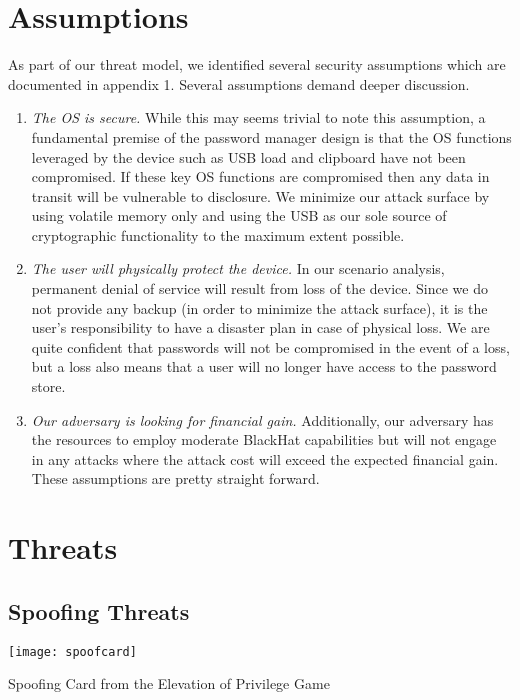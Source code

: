 \section{Assumptions}
\label{sec:assumptions}
As part of our threat model, we identified several security assumptions which are documented in appendix 1.  Several assumptions demand deeper discussion.
\begin{enumerate}
    \item{\emph{The OS is secure.} While this may seems trivial to note this assumption, a fundamental premise of the password manager design is that the OS functions leveraged by the device such as USB load and clipboard have not been compromised.  If these key OS functions are compromised then any data in transit will be vulnerable to disclosure.  We minimize our attack surface by using volatile memory only and using the USB as our sole source of cryptographic functionality to the maximum extent possible.}
    \item{\emph{The user will physically protect the device.} In our scenario analysis, permanent denial of service will result from loss of the device.  Since we do not provide any backup (in order to minimize the attack surface), it is the user's responsibility to have a disaster plan in case of physical loss.  We are quite confident that passwords will not be compromised in the event of a loss, but a loss also means that a user will no longer have access to the password store.}
    \item{\emph{Our adversary is looking for financial gain.} Additionally, our adversary has the resources to employ moderate BlackHat capabilities but will not engage in any attacks where the attack cost will exceed the expected financial gain.}
These assumptions are pretty straight forward.
\end{enumerate}


\section{Threats}
\label{sec:threats}

\subsection{Spoofing Threats}

\begin{marginfigure}%
\centering
  \texttt{[image: spoofcard]}
  \caption{Spoofing Card from the Elevation of Privilege Game}
  \label{fig:spoofcard}
\end{marginfigure}

